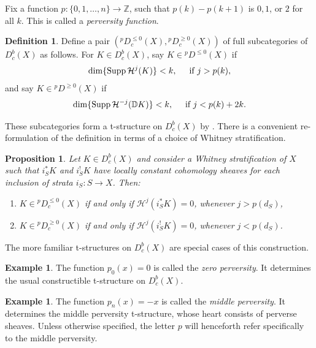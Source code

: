 \documentclass[11pt]{amsart}
\newtheorem{proposition}[equation]{Proposition}
\theoremstyle{definition}
\newtheorem{definition}[equation]{Definition}
\newtheorem{example}[equation]{Example}
\theoremstyle{plain}
\DeclareMathOperator{\Supp}{Supp}
\begin{document}
Fix a function $p: \{ 0,1, \ldots , n \} \rightarrow \mathbb{Z}$, such that $p(k) - p(k+1)$ is $0,1$, or $2$ for all $k$. This is called a \emph{perversity function}.

\begin{definition}
Define a pair $({}^p D_c^{\leq 0}(X), {}^p D_c^{\geq 0}(X))$ of full subcategories of $D_c^b(X)$ as follows. For $K \in D_c^b(X)$, say $K \in {}^p D^{\leq 0}(X)$ if
\begin{align*}
    \dim \{ \Supp \mathcal{H}^j (K) \} < k, \hspace{.5cm} \text{if } j > p(k),
\end{align*}
and say $K \in {}^p D^{\geq 0}(X)$ if
\begin{align*}
    \dim \{ \Supp \mathcal{H}^{-j} ( \mathbb{D}  K) \} < k, \hspace{.5cm} \text{if } j < p(k) + 2k.
\end{align*}
\end{definition}
These subcategories form a t-structure on $D_c^b(X)$ by \cite[Theorem $10.2.8$]{kashiwara}. There is a convenient re-formulation of the definition in terms of a choice of Whitney stratification.

\begin{proposition}\cite[Proposition $10.2.4$]{kashiwara}\label{prop locally constant}
Let $K \in D_c^b(X)$ and consider a Whitney stratification of $X$ such that $i_{S}^* K$ and $i_{S}^! K$ have locally constant cohomology sheaves for each inclusion of strata $i_S: S\rightarrow X$. Then:
\begin{enumerate}
    \item $K \in {}^p D^{\leq 0}_c(X)$ if and only if $\mathcal{H}^j(i_{S}^* K) = 0$, whenever $j > p(d_S)$,
    \item $K \in {}^p D_c^{\geq 0}(X)$ if and only if $\mathcal{H}^j(i_{S}^! K) = 0$, whenever $j < p(d_S)$.
\end{enumerate}
\end{proposition}

The more familiar t-structures on $D^b_c(X)$ are special cases of this construction.

\begin{example}\label{example cdef}
The function $p_0(x) = 0$ is called the \emph{zero perversity}. It determines the usual constructible t-structure on $D^b_c(X)$.
\end{example}

\begin{example}\label{example lcdef}
The function $p_n(x) = -x$ is called the \emph{middle perversity}. It determines the middle perversity t-structure, whose heart consists of perverse sheaves. Unless otherwise specified, the letter $p$ will henceforth refer specifically to the middle perversity.
\end{example}
\end{document}
